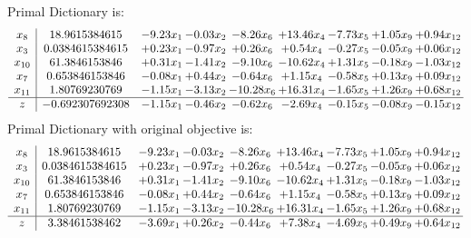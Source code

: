 \documentclass[8pt]{article}
\begin{document}
Primal Dictionary is:
\[\begin{array}{c| c c@{\hskip 2pt} c@{\hskip 2pt} c@{\hskip 2pt} c@{\hskip 2pt} c@{\hskip 2pt} c@{\hskip 2pt} c@{\hskip 2pt} }
 x_{8}   &  18.9615384615 & -9.23 x_{1} & -0.03 x_{2} & -8.26 x_{6} & + 13.46 x_{4} & -7.73 x_{5} & +  1.05 x_{9} & +  0.94 x_{12}\\
 x_{3}   &  0.0384615384615 & +  0.23 x_{1} & -0.97 x_{2} & +  0.26 x_{6} & +  0.54 x_{4} & -0.27 x_{5} & -0.05 x_{9} & +  0.06 x_{12}\\
 x_{10}   &  61.3846153846 & +  0.31 x_{1} & -1.41 x_{2} & -9.10 x_{6} & -10.62 x_{4} & +  1.31 x_{5} & -0.18 x_{9} & -1.03 x_{12}\\
 x_{7}   &  0.653846153846 & -0.08 x_{1} & +  0.44 x_{2} & -0.64 x_{6} & +  1.15 x_{4} & -0.58 x_{5} & +  0.13 x_{9} & +  0.09 x_{12}\\
 x_{11}   &  1.80769230769 & -1.15 x_{1} & -3.13 x_{2} & -10.28 x_{6} & + 16.31 x_{4} & -1.65 x_{5} & +  1.26 x_{9} & +  0.68 x_{12}\\
\hline
z    &  -0.692307692308 & -1.15 x_{1} & -0.46 x_{2} & -0.62 x_{6} & -2.69 x_{4} & -0.15 x_{5} & -0.08 x_{9} & -0.15 x_{12}\\
\end{array}\]
Primal Dictionary with original objective is:
\[\begin{array}{c| c c@{\hskip 2pt} c@{\hskip 2pt} c@{\hskip 2pt} c@{\hskip 2pt} c@{\hskip 2pt} c@{\hskip 2pt} c@{\hskip 2pt} }
 x_{8}   &  18.9615384615 & -9.23 x_{1} & -0.03 x_{2} & -8.26 x_{6} & + 13.46 x_{4} & -7.73 x_{5} & +  1.05 x_{9} & +  0.94 x_{12}\\
 x_{3}   &  0.0384615384615 & +  0.23 x_{1} & -0.97 x_{2} & +  0.26 x_{6} & +  0.54 x_{4} & -0.27 x_{5} & -0.05 x_{9} & +  0.06 x_{12}\\
 x_{10}   &  61.3846153846 & +  0.31 x_{1} & -1.41 x_{2} & -9.10 x_{6} & -10.62 x_{4} & +  1.31 x_{5} & -0.18 x_{9} & -1.03 x_{12}\\
 x_{7}   &  0.653846153846 & -0.08 x_{1} & +  0.44 x_{2} & -0.64 x_{6} & +  1.15 x_{4} & -0.58 x_{5} & +  0.13 x_{9} & +  0.09 x_{12}\\
 x_{11}   &  1.80769230769 & -1.15 x_{1} & -3.13 x_{2} & -10.28 x_{6} & + 16.31 x_{4} & -1.65 x_{5} & +  1.26 x_{9} & +  0.68 x_{12}\\
\hline
z    &  3.38461538462 & -3.69 x_{1} & +  0.26 x_{2} & -0.44 x_{6} & +  7.38 x_{4} & -4.69 x_{5} & +  0.49 x_{9} & +  0.64 x_{12}\\
\end{array}\]
\end{document}
